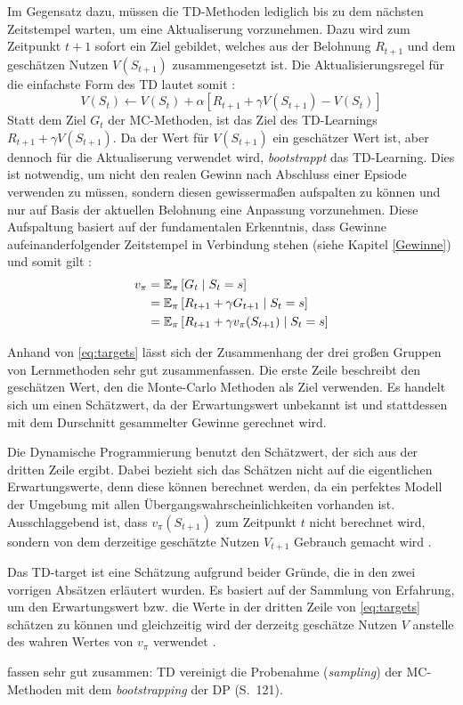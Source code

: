 Im Gegensatz dazu, müssen die TD-Methoden lediglich bis zu dem nächsten Zeitstempel warten, um eine Aktualiserung vorzunehmen. Dazu wird zum Zeitpunkt $t+1$ sofort ein Ziel gebildet, welches aus der Belohnung $R_{t+1}$ und dem geschätzen Nutzen $V(S_{t+1})$ zusammengesetzt ist. Die Aktualisierungsregel für die einfachste Form des TD lautet somit \cite[S.~120]{Sutton1998}:
\begin{equation}
    V(S_t) \leftarrow V(S_t) + \alpha \left[R_{t+1} + \gamma V(S_{t+1}) - V(S_t)\right]
\end{equation}
Statt dem Ziel $G_t$ der MC-Methoden, ist das Ziel des TD-Learnings $R_{t+1} + \gamma V(S_{t+1})$. Da der Wert für $V(S_{t+1})$ ein geschätzer Wert ist, aber dennoch für die Aktualiserung verwendet wird, \textit{bootstrappt} das TD-Learning. Dies ist notwendig, um nicht den realen Gewinn nach Abschluss einer Epsiode verwenden zu müssen, sondern diesen gewissermaßen aufspalten zu können und nur auf Basis der aktuellen Belohnung eine Anpassung vorzunehmen. Diese Aufspaltung basiert auf der fundamentalen Erkenntnis, dass Gewinne aufeinanderfolgender Zeitstempel in Verbindung stehen (siehe Kapitel \ref{Gewinne}) und somit gilt \cite[S.~120]{Sutton1998}: 
\begin{equation}\label{eq:targets}
\begin{aligned}
v_\pi &= \operatorname{\mathbb{E}}_\pi\left[G_t \mid S_t = s \right] \\
&= \operatorname{\mathbb{E}}_\pi\left[R_{t+1} + \gamma G_{t+1} \mid S_t = s \right] \\
        &= \operatorname{\mathbb{E}}_\pi\left[R_{t+1} + \gamma v_\pi(S_{t+1}) \mid S_t = s \right]
\end{aligned}
\end{equation}

Anhand von \ref{eq:targets} lässt sich der Zusammenhang der drei großen Gruppen von Lernmethoden sehr gut zusammenfassen. Die erste Zeile beschreibt den geschätzen Wert, den die Monte-Carlo Methoden als Ziel verwenden. Es handelt sich um einen Schätzwert, da der Erwartungswert unbekannt ist und stattdessen mit dem Durschnitt gesammelter Gewinne gerechnet wird. 
\par 
Die Dynamische Programmierung benutzt den Schätzwert, der sich aus der dritten Zeile ergibt. Dabei bezieht sich das Schätzen nicht auf die eigentlichen Erwartungswerte, denn diese können berechnet werden, da ein perfektes Modell der Umgebung mit allen Übergangswahrscheinlichkeiten vorhanden ist. Ausschlaggebend ist, dass $v_\pi(S_{t+1})$ zum Zeitpunkt $t$ nicht berechnet wird, sondern von dem derzeitige geschätzte Nutzen $V_{t+1}$ Gebrauch gemacht wird \cite[S.~120]{Sutton1998}.
\par 
Das TD-target ist eine Schätzung aufgrund beider Gründe, die in den zwei vorrigen Absätzen erläutert wurden. Es basiert auf der Sammlung von Erfahrung, um den Erwartungswert bzw. die Werte in der dritten Zeile von \ref{eq:targets} schätzen zu können und gleichzeitig wird der derzeitg geschätze Nutzen $V$ anstelle des wahren Wertes von $v_\pi$ verwendet \cite[S.~120f]{Sutton1998}.
\par
\cite{Sutton1998} fassen sehr gut zusammen: \glqq TD vereinigt die Probenahme (\textit{sampling}) der MC-Methoden mit dem \textit{bootstrapping} der DP\grqq{} (S.~121).

